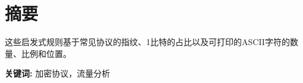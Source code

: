 \section*{摘要} %
这些启发式规则基于常见协议的指纹、1比特的占比以及可打印的ASCII字符的数量、比例和位置。

\vspace{28pt} 


\noindent\textbf{关键词:} 加密协议，流量分析  %

\newpage